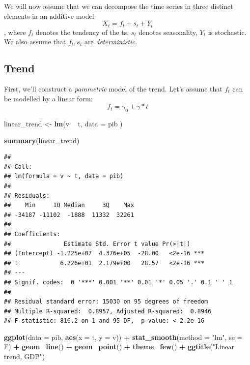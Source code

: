 \documentclass[]{article}
\newenvironment{Shaded}{\begin{snugshade}}{\end{snugshade}}
\newcommand{\DataTypeTok}[1]{\textcolor[rgb]{0.13,0.29,0.53}{#1}}
\newcommand{\KeywordTok}[1]{\textcolor[rgb]{0.13,0.29,0.53}{\textbf{#1}}}
\newcommand{\NormalTok}[1]{#1}
\newcommand{\OperatorTok}[1]{\textcolor[rgb]{0.81,0.36,0.00}{\textbf{#1}}}
\newcommand{\StringTok}[1]{\textcolor[rgb]{0.31,0.60,0.02}{#1}}
\begin{document}
We will now assume that we can decompose the time series in three
distinct elements in an additive model: \[ X_t = f_t+ s_t + Y_t \],
where \(f_t\) denotes the tendency of the ts, \(s_t\) denotes
seasonality, \(Y_t\) is stochastic. We also assume that \(f_t, s_t\) are
\emph{deterministic}.

\subsection{Trend}

First, we'll construct a \emph{parametric} model of the trend. Let's
assume that \(f_t\) can be modelled by a linear form:
\[ f_t = \gamma_0 + \gamma *t \]

\begin{Shaded}
\begin{Highlighting}[]
\NormalTok{linear_trend <-}\StringTok{ }\KeywordTok{lm}\NormalTok{(v }\OperatorTok{~}\StringTok{ }\NormalTok{t, }\DataTypeTok{data =}\NormalTok{ pib )}

\KeywordTok{summary}\NormalTok{(linear_trend)}
\end{Highlighting}
\end{Shaded}

\begin{verbatim}
## 
## Call:
## lm(formula = v ~ t, data = pib)
## 
## Residuals:
##    Min     1Q Median     3Q    Max 
## -34187 -11102  -1888  11332  32261 
## 
## Coefficients:
##               Estimate Std. Error t value Pr(>|t|)    
## (Intercept) -1.225e+07  4.376e+05  -28.00   <2e-16 ***
## t            6.226e+01  2.179e+00   28.57   <2e-16 ***
## ---
## Signif. codes:  0 '***' 0.001 '**' 0.01 '*' 0.05 '.' 0.1 ' ' 1
## 
## Residual standard error: 15030 on 95 degrees of freedom
## Multiple R-squared:  0.8957, Adjusted R-squared:  0.8946 
## F-statistic: 816.2 on 1 and 95 DF,  p-value: < 2.2e-16
\end{verbatim}

\begin{Shaded}
\begin{Highlighting}[]
\KeywordTok{ggplot}\NormalTok{(}\DataTypeTok{data =}\NormalTok{ pib, }\KeywordTok{aes}\NormalTok{(}\DataTypeTok{x =}\NormalTok{ t, }\DataTypeTok{y =}\NormalTok{ v)) }\OperatorTok{+}\StringTok{ }\KeywordTok{stat_smooth}\NormalTok{(}\DataTypeTok{method =} \StringTok{"lm"}\NormalTok{, }\DataTypeTok{se =}\NormalTok{ F) }\OperatorTok{+}\StringTok{ }\KeywordTok{geom_line}\NormalTok{() }\OperatorTok{+}\StringTok{ }\KeywordTok{geom_point}\NormalTok{() }\OperatorTok{+}\StringTok{ }\KeywordTok{theme_few}\NormalTok{() }\OperatorTok{+}\StringTok{ }\KeywordTok{ggtitle}\NormalTok{(}\StringTok{"Linear trend, GDP"}\NormalTok{)}
\end{Highlighting}
\end{Shaded}
\end{document}

